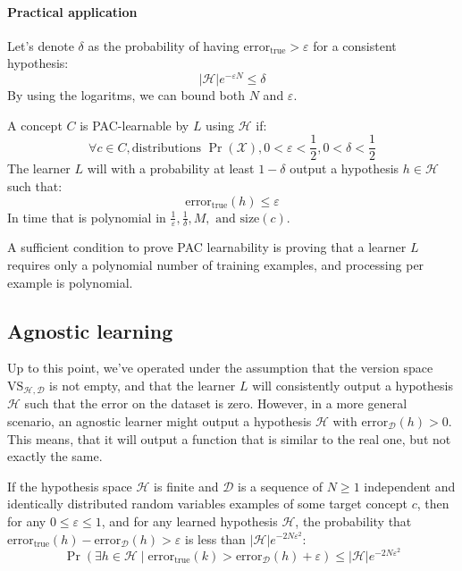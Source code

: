 \paragraph*{Practical application}
Let's denote $\delta$ as the probability of having $\text{error}_{\text{true}}>\varepsilon$ for a consistent hypothesis:
\[\left\lvert \mathcal{H}\right\rvert e^{-\varepsilon N} \leq \delta\]
By using the logaritms, we can bound both $N$ and $\varepsilon$. 

\begin{definition}
    A concept $C$ is PAC-learnable by $L$ using $\mathcal{H}$ if: 
    \[\forall c\in C, \text{distributions }\Pr(\mathcal{X}), 0 < \varepsilon < \frac{1}{2},  0 < \delta < \frac{1}{2}\]
    The learner $L$ will with a probability at least $1 - \delta$ output a hypothesis $h \in \mathcal{H}$ such that:
    \[\text{error}_{\text{true}}(h) \leq \varepsilon\] 
    In time that is polynomial in $\frac{1}{\varepsilon}, \frac{1}{\delta}, M, \text{ and }\text{size}(c)$.
\end{definition}
A sufficient condition to prove PAC learnability is proving that a learner $L$ requires only a polynomial number of training examples, and processing per example is polynomial.

\subsection{Agnostic learning}
Up to this point, we've operated under the assumption that the version space $\text{VS}_{\mathcal{H},\mathcal{D}}$ is not empty, and that the learner $L$ will consistently output a hypothesis $\mathcal{H}$ such that the error on the dataset is zero. 
However, in a more general scenario, an agnostic learner might output a hypothesis $\mathcal{H}$ with $\text{error}_{\mathcal{D}}(h) > 0$.
This means, that it will output a function that is similar to the real one, but not exactly the same. 
\begin{theorem}
    If the hypothesis space $\mathcal{H}$ is finite and $\mathcal{D}$ is a sequence of $N\geq 1$ independent and identically distributed random variables examples of some target concept $c$, then for any $0 \leq \varepsilon \leq 1$, and for any learned hypothesis $\mathcal{H}$, the probability that $\text{error}_{\text{true}}(h) - \text{error}_{\mathcal{D}}(h) > \varepsilon$ is less than $\left\lvert \mathcal{H}\right\rvert e^{-2N\varepsilon^2}$:
    \[\Pr(\exists h\in \mathcal{H}\mid\text{error}_{\text{true}}(k)>\text{error}_{\mathcal{D}}(h)+\varepsilon)\leq \left\lvert \mathcal{H}\right\rvert e^{-2N\varepsilon^2}\]
\end{theorem}

